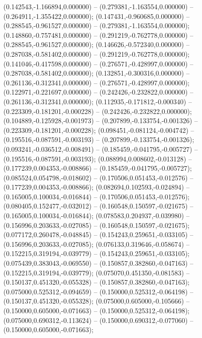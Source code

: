  (0.142543,-1.166894,0.000000) -- (0.279381,-1.163554,0.000000) -- (0.264911,-1.355422,0.000000);
 (0.147431,-0.960685,0.000000) -- (0.288545,-0.961527,0.000000) -- (0.279381,-1.163554,0.000000);
 (0.148860,-0.757481,0.000000) -- (0.291219,-0.762778,0.000000) -- (0.288545,-0.961527,0.000000);
 (0.146626,-0.572340,0.000000) -- (0.287038,-0.581402,0.000000) -- (0.291219,-0.762778,0.000000);
 (0.141046,-0.417598,0.000000) -- (0.276571,-0.428997,0.000000) -- (0.287038,-0.581402,0.000000);
 (0.132851,-0.300316,0.000000) -- (0.261136,-0.312341,0.000000) -- (0.276571,-0.428997,0.000000);
 (0.122971,-0.221697,0.000000) -- (0.242426,-0.232822,0.000000) -- (0.261136,-0.312341,0.000000);
 (0.112935,-0.171812,-0.000340) -- (0.223309,-0.181201,-0.000228) -- (0.242426,-0.232822,0.000000);
 (0.104889,-0.125928,-0.001973) -- (0.207899,-0.133754,-0.001326) -- (0.223309,-0.181201,-0.000228);
 (0.098451,-0.081124,-0.004742) -- (0.195516,-0.087591,-0.003193) -- (0.207899,-0.133754,-0.001326);
 (0.093241,-0.036512,-0.008491) -- (0.185459,-0.041795,-0.005727) -- (0.195516,-0.087591,-0.003193);
 (0.088994,0.008602,-0.013128) -- (0.177239,0.004353,-0.008866) -- (0.185459,-0.041795,-0.005727);
 (0.085524,0.054798,-0.018602) -- (0.170506,0.051453,-0.012576) -- (0.177239,0.004353,-0.008866);
 (0.082694,0.102593,-0.024894) -- (0.165005,0.100034,-0.016844) -- (0.170506,0.051453,-0.012576);
 (0.080405,0.152477,-0.032012) -- (0.160548,0.150597,-0.021675) -- (0.165005,0.100034,-0.016844);
 (0.078583,0.204937,-0.039980) -- (0.156996,0.203633,-0.027085) -- (0.160548,0.150597,-0.021675);
 (0.077172,0.260478,-0.048845) -- (0.154243,0.259651,-0.033105) -- (0.156996,0.203633,-0.027085);
 (0.076133,0.319646,-0.058674) -- (0.152215,0.319194,-0.039779) -- (0.154243,0.259651,-0.033105);
 (0.075439,0.383043,-0.069550) -- (0.150857,0.382860,-0.047163) -- (0.152215,0.319194,-0.039779);
 (0.075070,0.451350,-0.081583) -- (0.150137,0.451320,-0.055328) -- (0.150857,0.382860,-0.047163);
 (0.075000,0.525312,-0.094659) -- (0.150000,0.525312,-0.064198) -- (0.150137,0.451320,-0.055328);
 (0.075000,0.605000,-0.105666) -- (0.150000,0.605000,-0.071663) -- (0.150000,0.525312,-0.064198);
 (0.075000,0.690312,-0.113624) -- (0.150000,0.690312,-0.077060) -- (0.150000,0.605000,-0.071663);
